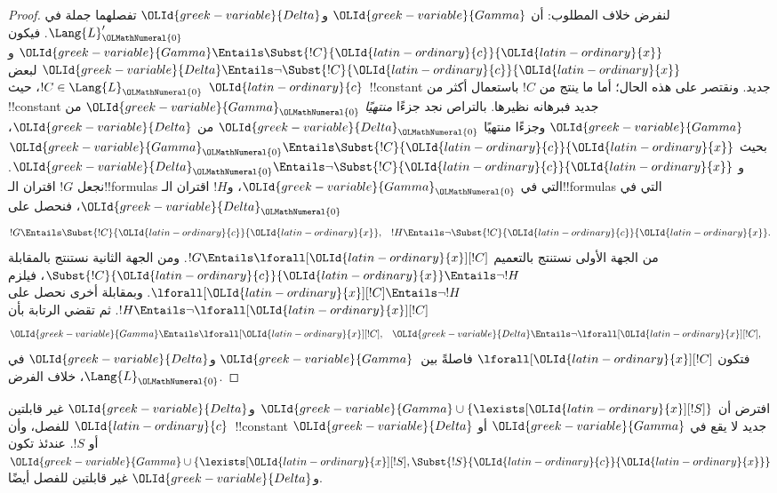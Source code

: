 \documentclass[../../../include/open-logic-section]{subfiles}
\begin{document}
\begin{proof}
لنفرض خلاف المطلوب: أن ${\OLId{greek-variable}{Gamma}}$ و${\OLId{greek-variable}{Delta}}$ تفصلهما
جملة في $\Lang{L}'_{\OLMathNumeral{0}}$. فيكون
${\OLId{greek-variable}{Gamma}} \Entails \Subst{!C}{{\OLId{latin-ordinary}{c}}}{{\OLId{latin-ordinary}{x}}}$ و
${\OLId{greek-variable}{Delta}} \Entails \lnot \Subst{!C}{{\OLId{latin-ordinary}{c}}}{{\OLId{latin-ordinary}{x}}}$ لبعض
$!C \in \Lang{L}_{\OLMathNumeral{0}}$، حيث ${\OLId{latin-ordinary}{c}}$~!!{constant} جديد.
ونقتصر على هذه الحال؛ أما ما ينتج من $!C$ باستعمال أكثر
من !!{constant} جديد فبرهانه نظيرها.
بالتراص نجد جزءًا \emph{منتهيًا} ${\OLId{greek-variable}{Gamma}}_{\OLMathNumeral{0}}$ من ${\OLId{greek-variable}{Gamma}}$
وجزءًا منتهيًا ${\OLId{greek-variable}{Delta}}_{\OLMathNumeral{0}}$ من ${\OLId{greek-variable}{Delta}}$، بحيث
${\OLId{greek-variable}{Gamma}}_{\OLMathNumeral{0}} \Entails \Subst{!C}{{\OLId{latin-ordinary}{c}}}{{\OLId{latin-ordinary}{x}}}$ و
${\OLId{greek-variable}{Delta}}_{\OLMathNumeral{0}} \Entails \lnot \Subst{!C}{{\OLId{latin-ordinary}{c}}}{{\OLId{latin-ordinary}{x}}}$.
نجعل $!G$ اقتران الـ!!{formula}s التي في ${\OLId{greek-variable}{Gamma}}_{\OLMathNumeral{0}}$،
و$!H$ اقتران الـ!!{formula}s التي في ${\OLId{greek-variable}{Delta}}_{\OLMathNumeral{0}}$، فنحصل على
\begin{align*}
  !G & \Entails \Subst{!C}{{\OLId{latin-ordinary}{c}}}{{\OLId{latin-ordinary}{x}}}, & !H  \Entails \lnot \Subst{!C}{{\OLId{latin-ordinary}{c}}}{{\OLId{latin-ordinary}{x}}}.
\end{align*}
من الجهة الأولى نستنتج بالتعميم $!G \Entails \lforall[{\OLId{latin-ordinary}{x}}][!C]$.
ومن الجهة الثانية نستنتج بالمقابلة
$\Subst{!C}{{\OLId{latin-ordinary}{c}}}{{\OLId{latin-ordinary}{x}}} \Entails \lnot !H$، فيلزم
$\lforall[{\OLId{latin-ordinary}{x}}][!C] \Entails \lnot !H$.
وبمقابلة أخرى نحصل على $!H \Entails \lnot \lforall[{\OLId{latin-ordinary}{x}}][!C]$.
ثم تقضي الرتابة بأن
\begin{align*}
  {\OLId{greek-variable}{Gamma}} &\Entails \lforall[{\OLId{latin-ordinary}{x}}][!C], &
  {\OLId{greek-variable}{Delta}} & \Entails \lnot \lforall[{\OLId{latin-ordinary}{x}}][!C],
\end{align*}
فتكون $\lforall[{\OLId{latin-ordinary}{x}}][!C]$ فاصلةً بين~${\OLId{greek-variable}{Gamma}}$ و${\OLId{greek-variable}{Delta}}$ في $\Lang{L}_{\OLMathNumeral{0}}$، خلاف الفرض.
\end{proof}

\begin{lem}
افترض أن ${\OLId{greek-variable}{Gamma}} \cup \{ \lexists[{\OLId{latin-ordinary}{x}}][!S] \}$ و${\OLId{greek-variable}{Delta}}$ غير قابلتين
للفصل، وأن ${\OLId{latin-ordinary}{c}}$~!!{constant} جديد لا يقع في ${\OLId{greek-variable}{Gamma}}$ أو ${\OLId{greek-variable}{Delta}}$ أو
$!S$. عندئذ تكون
${\OLId{greek-variable}{Gamma}} \cup \{ \lexists[{\OLId{latin-ordinary}{x}}][!S], \Subst{!S}{{\OLId{latin-ordinary}{c}}}{{\OLId{latin-ordinary}{x}}} \}$ و${\OLId{greek-variable}{Delta}}$
غير قابلتين للفصل أيضًا.
\end{lem}
\end{document}
